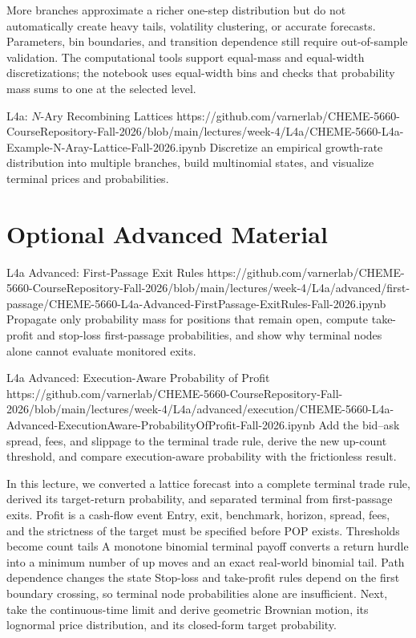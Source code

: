 \documentclass[11pt]{article}
\begin{document}
More branches approximate a richer one-step distribution but do not automatically create heavy tails, volatility clustering, or accurate forecasts. Parameters, bin boundaries, and transition dependence still require out-of-sample validation. The computational tools support equal-mass and equal-width discretizations; the notebook uses equal-width bins and checks that probability mass sums to one at the selected level.

\notebooklink
  {L4a: $N$-Ary Recombining Lattices}
  {https://github.com/varnerlab/CHEME-5660-CourseRepository-Fall-2026/blob/main/lectures/week-4/L4a/CHEME-5660-L4a-Example-N-Aray-Lattice-Fall-2026.ipynb}
  {Discretize an empirical growth-rate distribution into multiple branches, build multinomial states, and visualize terminal prices and probabilities.}

\section*{Optional Advanced Material}

\notebooklink
  {L4a Advanced: First-Passage Exit Rules}
  {https://github.com/varnerlab/CHEME-5660-CourseRepository-Fall-2026/blob/main/lectures/week-4/L4a/advanced/first-passage/CHEME-5660-L4a-Advanced-FirstPassage-ExitRules-Fall-2026.ipynb}
  {Propagate only probability mass for positions that remain open, compute take-profit and stop-loss first-passage probabilities, and show why terminal nodes alone cannot evaluate monitored exits.}

\notebooklink
  {L4a Advanced: Execution-Aware Probability of Profit}
  {https://github.com/varnerlab/CHEME-5660-CourseRepository-Fall-2026/blob/main/lectures/week-4/L4a/advanced/execution/CHEME-5660-L4a-Advanced-ExecutionAware-ProbabilityOfProfit-Fall-2026.ipynb}
  {Add the bid--ask spread, fees, and slippage to the terminal trade rule, derive the new up-count threshold, and compare execution-aware probability with the frictionless result.}

\newpage
\thispagestyle{fancy}
\keytakeaways
  {In this lecture, we converted a lattice forecast into a complete terminal trade rule, derived its target-return probability, and separated terminal from first-passage exits.}
  {Profit is a cash-flow event}
  {Entry, exit, benchmark, horizon, spread, fees, and the strictness of the target must be specified before POP exists.}
  {Thresholds become count tails}
  {A monotone binomial terminal payoff converts a return hurdle into a minimum number of up moves and an exact real-world binomial tail.}
  {Path dependence changes the state}
  {Stop-loss and take-profit rules depend on the first boundary crossing, so terminal node probabilities alone are insufficient.}
  {Next, take the continuous-time limit and derive geometric Brownian motion, its lognormal price distribution, and its closed-form target probability.}
\end{document}
